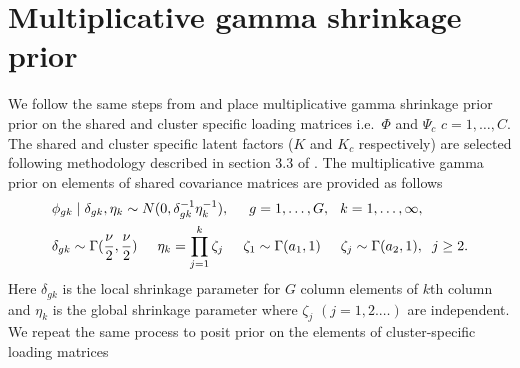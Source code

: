 \documentclass[
]{book}
\begin{document}
\hypertarget{multiplicative-gamma-shrinkage-prior}{%
\section{Multiplicative gamma shrinkage prior}\label{multiplicative-gamma-shrinkage-prior}}

We follow the same steps from \citet{de2018bayesian} and place multiplicative gamma shrinkage prior \citep{bhattacharya2011sparse} prior on the shared and cluster specific loading matrices i.e.~\(\Phi\) and \(\Psi_{c}\) \(c=1,\dots,C\). The shared and cluster specific latent factors (\(K\) and \(K_{c}\) respectively) are selected following methodology described in section 3.3 of \citet{de2018bayesian}. The multiplicative gamma prior on elements of shared covariance matrices are provided as follows
\begin{equation}
\begin{split}
& \phi_{gk} \mid \delta_{gk}, \eta_{k} \sim N(0, \delta_{gk}^{-1} \eta_{k}^{-1}), \hspace{0.5cm} g = 1, \dots , G, \hspace{0.25cm} k = 1, \dots, \infty, \\
& \delta_{gk} \sim \Gamma(\frac{\nu}{2}, \frac{\nu}{2}) \hspace{0.5cm}  \eta_{k} = \prod_{j=1}^{k} \zeta_{j} \hspace{0.5cm} \zeta_{1} \sim \Gamma(a_{1},1) \hspace{0.5cm}  \zeta_{j} \sim \Gamma(a_{2},1), \hspace{0.2cm} j \ge 2. 
\end{split}
\end{equation}
Here \(\delta_{gk}\) is the local shrinkage parameter for \(G\) column elements of \(k\)th column and \(\eta_{k}\) is the global shrinkage parameter where \(\zeta_{j}\) \((j=1,2. \dots)\) are independent. We repeat the same process to posit prior on the elements of cluster-specific loading matrices
\end{document}
